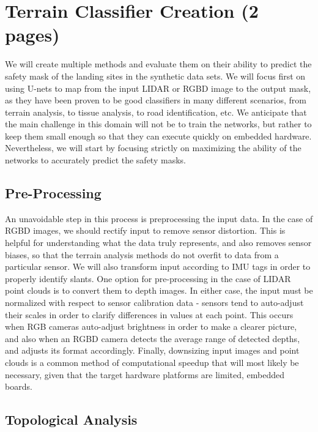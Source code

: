 \section{Terrain Classifier Creation (2 pages)}

We will create multiple methods and evaluate them on their ability to predict the
safety mask of the landing sites in the synthetic data sets.
We will focus first on using U-nets to map from the input LIDAR or RGBD image
to the output mask, as they have been proven to be good classifiers in many different scenarios,
from terrain analysis, to tissue analysis, to road identification, etc.
We anticipate that the main challenge in this domain will not be
to train the networks, but rather to keep them small enough
so that they can execute quickly on embedded hardware.
Nevertheless, we will start by focusing strictly on maximizing the ability of the networks
to accurately predict the safety masks.

\subsection{Pre-Processing}

An unavoidable step in this process is preprocessing the input data.
In the case of RGBD images, we should rectify input to remove sensor distortion.
This is helpful for understanding what the data truly represents,
and also removes sensor biases, so that the terrain analysis methods do not overfit to data from a particular sensor.
We will also transform input according to IMU tags in order to properly identify slants.
One option for pre-processing in the case of LIDAR point clouds is to convert them to depth images.
In either case, the input must be normalized with respect to sensor calibration data -
sensors tend to auto-adjust their scales in order to clarify differences in values at each point.
This occurs when RGB cameras auto-adjust brightness in order to make a clearer picture,
and also when an RGBD camera detects the average range of detected depths, and adjusts its format accordingly.
Finally, downsizing input images and point clouds is a common method of computational speedup
that will most likely be necessary, given that the target hardware platforms are limited, embedded boards.

\subsection{Topological Analysis}


